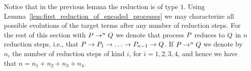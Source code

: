 










%

Notice that in the previous lemma the reduction is of type $1$.
Using Lemma~\ref{lem:first_reduction_of_encoded_processes} we may characterize all possible evolutions of the target terms after any number of reduction steps. For the rest of this section with $P\rightarrow^nQ$ we denote that process $P$ reduces to $Q$ in $n$ reduction steps, i.e., that $P\rightarrow P_1\rightarrow\ldots\rightarrow P_{n-1}\rightarrow Q$. If $P\rightarrow^nQ$ we denote by $n_i$ the number of reduction steps of kind $i$, for $i=1,2,3,4$, and hence we have that $n=n_1+n_2+n_3+n_4$.

